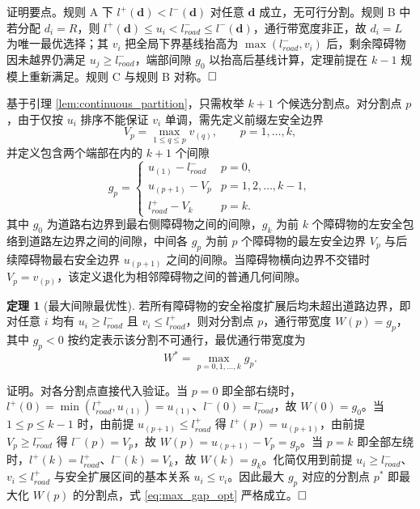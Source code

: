 \documentclass[a4paper,zihao=5]{ctexart}
\theoremstyle{definition}
\newtheorem{theorem}{定理}[section]
\begin{document}
证明要点。规则 A 下 $l^{+}(\mathbf{d}) < l^{-}(\mathbf{d})$ 对任意 $\mathbf{d}$ 成立，无可行分割。规则 B 中若分配 $d_i = R$，则 $l^{+}(\mathbf{d}) \leq u_i < l_{road}^{-} \leq l^{-}(\mathbf{d})$，通行带宽度非正，故 $d_i = L$ 为唯一最优选择；其 $v_i$ 把全局下界基线抬高为 $\max(l_{road}^{-},v_i)$ 后，剩余障碍物因未越界仍满足 $u_j\geq l_{road}^{-}$，端部间隙 $g_0$ 以抬高后基线计算，定理前提在 $k-1$ 规模上重新满足。规则 C 与规则 B 对称。$\hfill\Box$

基于引理 \ref{lem:continuous_partition}，只需枚举 $k+1$ 个候选分割点。对分割点 $p$，由于仅按 $u_i$ 排序不能保证 $v_i$ 单调，需先定义前缀左安全边界
\begin{equation}
    V_p = \max_{1 \leq q \leq p} v_{(q)}, \qquad p = 1, \ldots, k,
    \label{eq:prefix_v}
\end{equation}
并定义包含两个端部在内的 $k+1$ 个间隙
\begin{equation}
    g_p = \begin{cases}
        u_{(1)} - l_{road}^{-} & p = 0, \\[0.3em]
        u_{(p+1)} - V_p & p = 1, 2, \ldots, k-1, \\[0.3em]
        l_{road}^{+} - V_k & p = k.
    \end{cases}
    \label{eq:gap_def}
\end{equation}
其中 $g_0$ 为道路右边界到最右侧障碍物之间的间隙，$g_k$ 为前 $k$ 个障碍物的左安全包络到道路左边界之间的间隙，中间各 $g_p$ 为前 $p$ 个障碍物的最左安全边界 $V_p$ 与后续障碍物最右安全边界 $u_{(p+1)}$ 之间的间隙。当障碍物横向边界不交错时 $V_p = v_{(p)}$，该定义退化为相邻障碍物之间的普通几何间隙。

\begin{theorem}[最大间隙最优性]
\label{thm:max_gap}
若所有障碍物的安全裕度扩展后均未超出道路边界，即对任意 $i$ 均有 $u_i \geq l_{road}^{-}$ 且 $v_i \leq l_{road}^{+}$，则对分割点 $p$，通行带宽度 $W(p) = g_p$，其中 $g_p < 0$ 按约定表示该分割不可通行，最优通行带宽度为
\begin{equation}
    W^{*} = \max_{p = 0, 1, \ldots, k} g_p.
    \label{eq:max_gap_opt}
\end{equation}
\end{theorem}

证明。对各分割点直接代入验证。当 $p = 0$ 即全部右绕时，$l^{+}(0) = \min(l_{road}^{+}, u_{(1)}) = u_{(1)}$、$l^{-}(0) = l_{road}^{-}$，故 $W(0) = g_0$。当 $1 \leq p \leq k-1$ 时，由前提 $u_{(p+1)} \leq l_{road}^{+}$ 得 $l^{+}(p) = u_{(p+1)}$，由前提 $V_p \geq l_{road}^{-}$ 得 $l^{-}(p) = V_p$，故 $W(p) = u_{(p+1)} - V_p = g_p$。当 $p = k$ 即全部左绕时，$l^{+}(k) = l_{road}^{+}$、$l^{-}(k) = V_k$，故 $W(k) = g_k$。化简仅用到前提 $u_i \geq l_{road}^{-}$、$v_i \leq l_{road}^{+}$ 与安全扩展区间的基本关系 $u_i \leq v_i$。因此最大 $g_p$ 对应的分割点 $p^{*}$ 即最大化 $W(p)$ 的分割点，式 \eqref{eq:max_gap_opt} 严格成立。$\hfill\Box$
\end{document}
